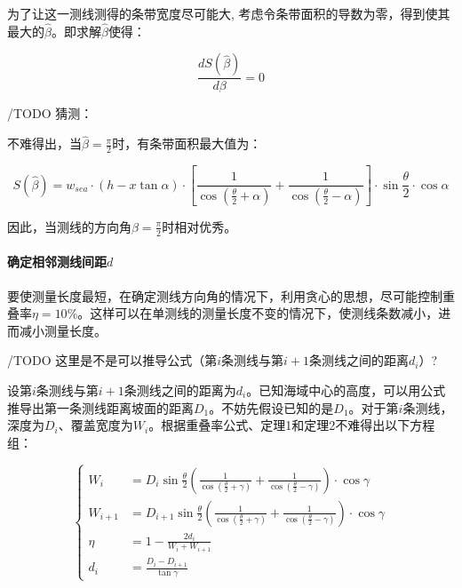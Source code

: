 为了让这一测线测得的条带宽度尽可能大, 考虑令条带面积的导数为零，得到使其最大的$\hat \beta$。即求解$\hat \beta$使得：

\begin{equation}
    \frac{dS(\hat \beta)}{d\beta} = 0
\end{equation}

/TODO 猜测：

不难得出，当$\hat \beta = \frac{\pi}{2}$时，有条带面积最大值为：

\begin{equation}
    S(\hat \beta) = 
    w_{sea} \cdot (h - x\tan \alpha) \cdot \left[
        \frac{1}{\cos \left(
            \frac{\theta}{2} + \alpha
        \right)} + \frac{1}{\cos \left(
            \frac{\theta}{2} - \alpha
        \right)}
    \right]\cdot \sin \frac{\theta}{2} \cdot \cos \alpha
\end{equation}

因此，当测线的方向角$\beta = \frac{\pi}{2}$时相对优秀。

\paragraph{确定相邻测线间距$d$}

要使测量长度最短，在确定测线方向角的情况下，利用贪心的思想，尽可能控制重叠率$\eta = 10\%$。这样可以在单测线的测量长度不变的情况下，使测线条数减小，进而减小测量长度。

/TODO 这里是不是可以推导公式（第$i$条测线与第$i+1$条测线之间的距离$d_i$）?

设第$i$条测线与第$i + 1$条测线之间的距离为$d_i$。已知海域中心的高度，可以用公式推导出第一条测线距离坡面的距离$D_1$。不妨先假设已知的是$D_1$。对于第$i$条测线，深度为$D_i$、覆盖宽度为$W_i$。根据重叠率公式、定理1和定理2不难得出以下方程组：

\begin{equation}
    \begin{cases}
        W_i & = D_i\sin\frac{\theta}{2}\left(\frac{1}{\cos(\frac{\theta}{2}+\gamma)} + \frac{1}{\cos(\frac{\theta}{2}-\gamma)}\right) \cdot \cos \gamma\\
        W_{i + 1} & = D_{i + 1}\sin\frac{\theta}{2}\left(\frac{1}{\cos(\frac{\theta}{2}+\gamma)} + \frac{1}{\cos(\frac{\theta}{2}-\gamma)}\right) \cdot \cos \gamma\\
        \eta & = 1 - \frac{2d_i}{W_i + W_{i + 1}}\\
        d_i & = \frac{D_i - D_{i + 1}}{\tan \gamma}
    \end{cases}
\end{equation}

